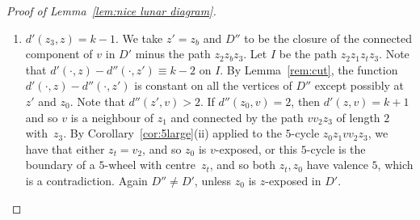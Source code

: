 \documentclass[a4paper,12pt,leqno]{amsart}
\theoremstyle{definition}
\begin{document}
\begin{proof}[Proof of Lemma~\ref{lem:nice lunar diagram}]
\begin{enumerate}
\item[(c)] $d'(z_3,z) = k-1$. We take $z'=z_b$ and $D''$ to be the closure of the connected component of $v$ in $D'$ minus the path $z_2z_bz_3$. Let $I$ be the path $z_2z_1z_tz_3$. Note that $d'(\cdot,z)-d''(\cdot,z')\equiv k-2$ on $I$. By Lemma~\ref{rem:cut}, the function $d'(\cdot,z)-d''(\cdot,z')$ is constant on all the vertices of $D''$  except possibly at $z'$ and $z_0$. Note that $d''(z',v)>2$. If $d''(z_0,v)=2$, then $d'(z,v)=k+1$ and so $v$ is a neighbour of $z_1$ and connected by the path $vv_2z_3$ of length $2$ with~$z_3$. By Corollary~\ref{cor:5large}(ii) applied to the $5$-cycle $z_0z_1vv_2z_3$, we have that either $z_t=v_2$, and so $z_0$ is $v$-exposed, or this $5$-cycle is the boundary of a $5$-wheel with centre~$z_t$, and so both $z_t,z_0$ have valence $5$, which is a contradiction. Again $D''\neq D'$, unless $z_0$ is $z$-exposed in $D'$.
\end{enumerate}
\end{proof}
\end{document}
